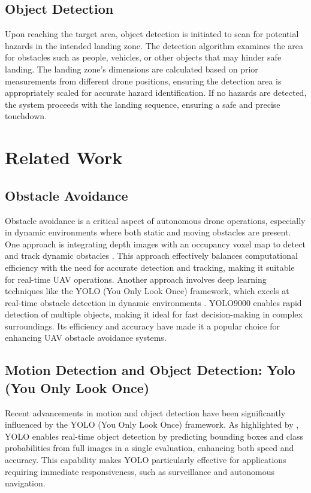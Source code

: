 \documentclass[3p,times]{elsarticle}
\begin{document}
\subsection{Object Detection}
Upon reaching the target area, object detection is initiated to scan for potential hazards in the intended landing zone. The detection algorithm examines the area for obstacles such as people, vehicles, or other objects that may hinder safe landing. The landing zone's dimensions are calculated based on prior measurements from different drone positions, ensuring the detection area is appropriately scaled for accurate hazard identification. If no hazards are detected, the system proceeds with the landing sequence, ensuring a safe and precise touchdown.

\newpage \section{Related Work} \label{sec:related}

\subsection{Obstacle Avoidance}
Obstacle avoidance is a critical aspect of autonomous drone operations, especially in dynamic environments where both static and moving obstacles are present. One approach is integrating depth images with an occupancy voxel map to detect and track dynamic obstacles \cite{xu2023real}. This approach effectively balances computational efficiency with the need for accurate detection and tracking, making it suitable for real-time UAV operations. Another approach involves deep learning techniques like the YOLO (You Only Look Once) framework, which excels at real-time obstacle detection in dynamic environments \cite{redmon2017yolo9000}. YOLO9000 enables rapid detection of multiple objects, making it ideal for fast decision-making in complex surroundings. Its efficiency and accuracy have made it a popular choice for enhancing UAV obstacle avoidance systems.

\subsection{Motion Detection and Object Detection: Yolo (You Only Look Once)}
Recent advancements in motion and object detection have been significantly influenced by the YOLO (You Only Look Once) framework. As highlighted by \cite{dahirou2021motion}, YOLO enables real-time object detection by predicting bounding boxes and class probabilities from full images in a single evaluation, enhancing both speed and accuracy. This capability makes YOLO particularly effective for applications requiring immediate responsiveness, such as surveillance and autonomous navigation.
\end{document}
